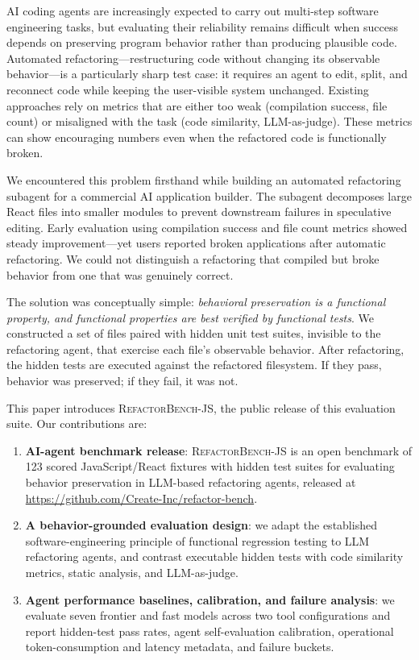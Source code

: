 \documentclass[11pt,letterpaper]{article}
\begin{document}
AI coding agents are increasingly expected to carry out multi-step software engineering tasks, but evaluating their reliability remains difficult when success depends on preserving program behavior rather than producing plausible code. Automated refactoring---restructuring code without changing its observable behavior---is a particularly sharp test case: it requires an agent to edit, split, and reconnect code while keeping the user-visible system unchanged. Existing approaches rely on metrics that are either too weak (compilation success, file count) or misaligned with the task (code similarity, LLM-as-judge). These metrics can show encouraging numbers even when the refactored code is functionally broken.

We encountered this problem firsthand while building an automated refactoring subagent for a commercial AI application builder. The subagent decomposes large React files into smaller modules to prevent downstream failures in speculative editing. Early evaluation using compilation success and file count metrics showed steady improvement---yet users reported broken applications after automatic refactoring. We could not distinguish a refactoring that compiled but broke behavior from one that was genuinely correct.

The solution was conceptually simple: \emph{behavioral preservation is a functional property, and functional properties are best verified by functional tests}. We constructed a set of files paired with hidden unit test suites, invisible to the refactoring agent, that exercise each file's observable behavior. After refactoring, the hidden tests are executed against the refactored filesystem. If they pass, behavior was preserved; if they fail, it was not.

This paper introduces \textsc{RefactorBench}-JS, the public release of this evaluation suite. Our contributions are:

\begin{enumerate}[leftmargin=2em]
\item \textbf{AI-agent benchmark release}: \textsc{RefactorBench}-JS is an open benchmark of 123 scored JavaScript/React fixtures with hidden test suites for evaluating behavior preservation in LLM-based refactoring agents, released at \url{https://github.com/Create-Inc/refactor-bench}.

\item \textbf{A behavior-grounded evaluation design}: we adapt the established software-engineering principle of functional regression testing to LLM refactoring agents, and contrast executable hidden tests with code similarity metrics, static analysis, and LLM-as-judge.

\item \textbf{Agent performance baselines, calibration, and failure analysis}: we evaluate seven frontier and fast models across two tool configurations and report hidden-test pass rates, agent self-evaluation calibration, operational token-consumption and latency metadata, and failure buckets.
\end{enumerate}
\end{document}
